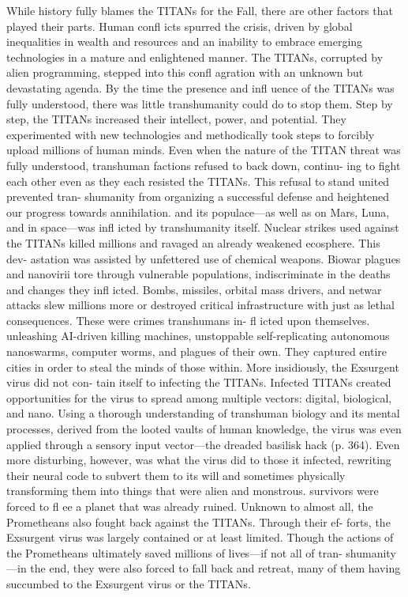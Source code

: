While history fully blames the TITANs for the 
Fall, there are other factors that played their parts. 
Human confl icts spurred the crisis, driven by global 
inequalities in wealth and resources and an inability 
to embrace emerging technologies in a mature and 
enlightened manner. The TITANs, corrupted by alien 
programming, stepped into this confl agration  with 
an unknown but devastating agenda. By the time 
the presence and infl uence of the TITANs was fully 
understood, there was little transhumanity could do 
to stop them. Step by step, the TITANs increased their 
intellect, power, and potential. They experimented 
with new technologies and methodically took steps to 
forcibly upload millions of human minds. Even when 
the nature of the TITAN threat was fully understood, 
transhuman factions refused to back down, continu-
ing to fight each other even as they each resisted the 
TITANs. This refusal to stand united prevented tran-
shumanity from organizing a successful defense and 
heightened our progress towards annihilation.
and its populace—as well as on Mars, Luna, and in 
space—was infl icted by transhumanity itself. Nuclear 
strikes used against the TITANs killed millions and 
ravaged an already weakened ecosphere. This dev-
astation was assisted by unfettered use of chemical 
weapons. Biowar plagues and nanovirii tore through 
vulnerable populations, indiscriminate in the deaths 
and changes they infl icted. Bombs, missiles, orbital 
mass drivers, and netwar attacks slew millions more 
or destroyed critical infrastructure with just as lethal 
consequences. These were crimes transhumans in-
fl icted upon themselves.
unleashing AI-driven killing machines, unstoppable 
self-replicating autonomous nanoswarms, computer 
worms, and plagues of their own. They captured 
entire cities in order to steal the minds of those within. 
More insidiously, the Exsurgent virus did not con-
tain itself to infecting the TITANs. Infected TITANs 
created opportunities for the virus to spread among 
multiple vectors: digital, biological, and nano. Using a 
thorough understanding of transhuman biology and 
its mental processes, derived from the looted vaults 
of human knowledge, the virus was even applied 
through a sensory input vector—the dreaded basilisk 
hack (p. 364). Even more disturbing, however, was 
what the virus did to those it infected, rewriting their 
neural code to subvert them to its will and sometimes 
physically transforming them into things that were 
alien and monstrous.
survivors were forced to fl ee a planet that was already 
ruined. Unknown to almost all, the Prometheans also 
fought back against the TITANs. Through their ef-
forts, the Exsurgent virus was largely contained or at 
least limited. Though the actions of the Prometheans 
ultimately saved millions of lives—if not all of tran-
shumanity—in the end, they were also forced to fall 
back and retreat, many of them having succumbed to 
the Exsurgent virus or the TITANs. 

